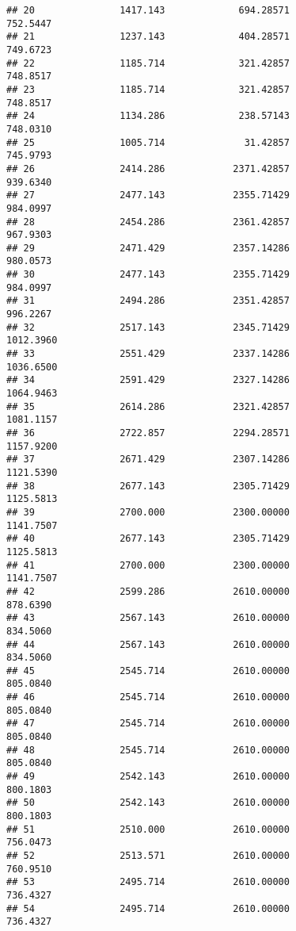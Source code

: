 \documentclass[]{article}
\begin{document}
\begin{verbatim}
## 20               1417.143             694.28571                 752.5447
## 21               1237.143             404.28571                 749.6723
## 22               1185.714             321.42857                 748.8517
## 23               1185.714             321.42857                 748.8517
## 24               1134.286             238.57143                 748.0310
## 25               1005.714              31.42857                 745.9793
## 26               2414.286            2371.42857                 939.6340
## 27               2477.143            2355.71429                 984.0997
## 28               2454.286            2361.42857                 967.9303
## 29               2471.429            2357.14286                 980.0573
## 30               2477.143            2355.71429                 984.0997
## 31               2494.286            2351.42857                 996.2267
## 32               2517.143            2345.71429                1012.3960
## 33               2551.429            2337.14286                1036.6500
## 34               2591.429            2327.14286                1064.9463
## 35               2614.286            2321.42857                1081.1157
## 36               2722.857            2294.28571                1157.9200
## 37               2671.429            2307.14286                1121.5390
## 38               2677.143            2305.71429                1125.5813
## 39               2700.000            2300.00000                1141.7507
## 40               2677.143            2305.71429                1125.5813
## 41               2700.000            2300.00000                1141.7507
## 42               2599.286            2610.00000                 878.6390
## 43               2567.143            2610.00000                 834.5060
## 44               2567.143            2610.00000                 834.5060
## 45               2545.714            2610.00000                 805.0840
## 46               2545.714            2610.00000                 805.0840
## 47               2545.714            2610.00000                 805.0840
## 48               2545.714            2610.00000                 805.0840
## 49               2542.143            2610.00000                 800.1803
## 50               2542.143            2610.00000                 800.1803
## 51               2510.000            2610.00000                 756.0473
## 52               2513.571            2610.00000                 760.9510
## 53               2495.714            2610.00000                 736.4327
## 54               2495.714            2610.00000                 736.4327

\end{verbatim}
\end{document}
